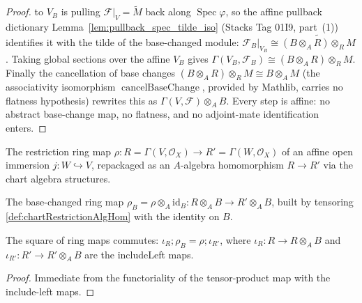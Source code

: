\begin{lemma}
\begin{proof}
    to \(V_B\) is pulling \(\mathcal{F}|_V = \widetilde M\) back along
    \(\operatorname{Spec}\varphi\), so the affine pullback dictionary
    Lemma~\ref{lem:pullback_spec_tilde_iso} (Stacks Tag 01I9, part~(1)) identifies it with
    the tilde of the base-changed module:
    \(\mathcal{F}_B|_{V_B} \cong \widetilde{(B \otimes_A R) \otimes_R M}\). Taking global
    sections over the affine \(V_B\) gives
    \(\Gamma(V_B,\mathcal{F}_B) \cong (B \otimes_A R)\otimes_R M\). Finally the cancellation
    of base changes \((B \otimes_A R)\otimes_R M \cong B \otimes_A M\) (the associativity
    isomorphism \(\operatorname{cancelBaseChange}\), provided by Mathlib, carries no
    flatness hypothesis) rewrites this as \(\Gamma(V,\mathcal{F}) \otimes_A B\). Every step
    is affine: no abstract base-change map, no flatness, and no adjoint-mate identification
    enters.
  \end{proof}
\end{lemma}


\begin{definition}
  \label{def:chartRestrictionAlgHom}
  The restriction ring map \(\rho : R = \Gamma(V,\mathcal{O}_X)\to R' = \Gamma(W,\mathcal{O}_X)\) of an
  affine open immersion \(j : W\hookrightarrow V\), repackaged as an \(A\)-algebra homomorphism
  \(R\to R'\) via the chart algebra structures.
\end{definition}

\begin{definition}
  \label{def:chartBaseChangeRingMap}
  The base-changed ring map \(\rho_B = \rho\otimes_A\mathrm{id}_B : R\otimes_A B\to R'\otimes_A B\),
  built by tensoring \cref{def:chartRestrictionAlgHom} with the identity on \(B\).
\end{definition}

\begin{lemma}
  \label{lem:chartBaseChange_ring_square}
  The square of ring maps commutes: \(\iota_R \mathbin{;}\rho_B = \rho\mathbin{;}\iota_{R'}\), where
  \(\iota_R : R\to R\otimes_A B\) and \(\iota_{R'} : R'\to R'\otimes_A B\) are the includeLeft maps.
  \begin{proof}
    Immediate from the functoriality of the tensor-product map with the include-left maps.
  \end{proof}
\end{lemma}

